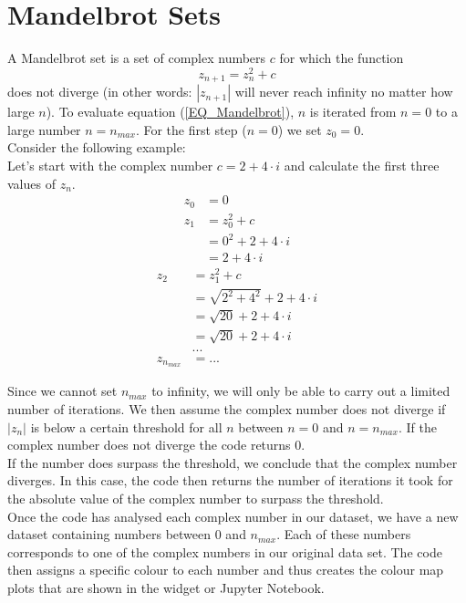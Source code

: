 \documentclass[
  12pt,					%
  a4paper,				%
  twoside,				%
]{report}
\begin{document}
\section{Mandelbrot Sets}
A Mandelbrot set is a set of complex numbers $c$ for which the function
\begin{equation}\label{EQ_Mandelbrot}
	z_{n+1} = z_{n}^2 + c
\end{equation}
does not diverge (in other words:  $|z_{n+1}|$ will never reach infinity no matter how large $n$). To evaluate equation (\ref{EQ_Mandelbrot}), $n$ is iterated from $n=0$ to a large number $n=n_{max}$. For the first step ($n=0$) we set $z_0 = 0$.\\

Consider the following example:\\
Let's start with the complex number $c = 2 + 4 \cdot i$ and calculate the first three values of $z_n$.
\begin{align*}
	z_0 &= 0\\
	z_1 &= z_0^2 + c\\
	    &= 0^2 + 2 + 4 \cdot i	\\
	    &= 2 + 4 \cdot i
\end{align*}
\begin{align*}
	z_2 &= z_1^2 + c\\
	    &= \sqrt{2^2 + 4^2} + 2 + 4 \cdot i\\
	    &= \sqrt{20} + 2 + 4 \cdot i\\
	    &= \sqrt{20} + 2 + 4 \cdot i\\
	    &...\\
	z_{n_{max}} &= ...
\end{align*}

Since we cannot set $n_{max}$ to infinity, we will only be able to carry out a limited number of iterations. We then assume the complex number does not diverge if $|z_{n}|$ is below a certain threshold for all $n$ between $n=0$ and $n=n_{max}$. If the complex number does not diverge the code returns $0$.\\
If the number does surpass the threshold, we conclude that the complex number diverges. In this case, the code then returns the number of iterations it took for the absolute value of the complex number to surpass the threshold.\\
Once the code has analysed each complex number in our dataset, we have a new dataset containing numbers between $0$ and $n_{max}$. Each of these numbers corresponds to one of the complex numbers in our original data set. The code then assigns a specific colour to each number and thus creates the colour map plots that are shown in the widget or Jupyter Notebook.
\end{document}
